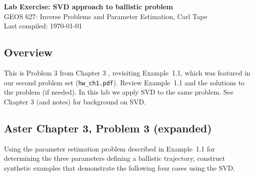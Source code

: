 \documentclass[11pt,titlepage,fleqn]{article}
\begin{document}

\begin{spacing}{1.2}
\centering
{\large \bf Lab Exercise: SVD approach to ballistic problem} \\
GEOS 627: Inverse Problems and Parameter Estimation, Carl Tape \\
Last compiled: \today
\end{spacing}


\subsection*{Overview}

This is Problem 3 from Chapter 3 \citep{AsterE2}, revisiting Example~1.1, which was featured in our second problem set (\verb+hw_ch1.pdf+). Review Example~1.1 and the solutions to the problem (if needed). In this lab we apply SVD to the same problem. See Chapter 3 (and notes) for background on SVD.


\subsection*{Aster Chapter 3, Problem 3 (expanded)}

Using the parameter estimation problem described in Example~1.1 for determining the three parameters defining a ballistic trajectory, construct synthetic examples that demonstrate the following four cases using the SVD.
\end{document}
